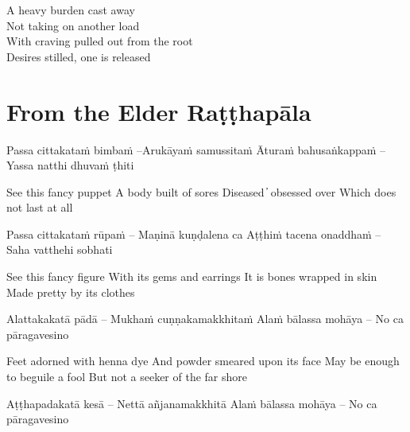 \begin{english}
  A heavy burden cast away\\
  Not taking on another load\\
  With craving pulled out from the root\\
  Desires stilled, one is released
\end{english}


\clearpage

\section{From the Elder Raṭṭhapāla}

\begin{leader}
\end{leader}

\begin{twochants}
Passa cittakataṁ bimbaṁ –Arukāyaṁ samussitaṁ
Āturaṁ bahusaṅkappaṁ – Yassa natthi dhuvaṁ ṭhiti
\end{twochants}

\begin{english}
See this fancy puppet
A body built of sores
Diseased  ̓  obsessed over
Which does not last at all
\end{english}

\begin{twochants}
Passa cittakataṁ rūpaṁ – Maṇinā kuṇḍalena ca
Aṭṭhiṁ tacena onaddhaṁ – Saha vatthehi sobhati
\end{twochants}

\begin{english}
See this fancy figure
With its gems and earrings
It is bones wrapped in skin
Made pretty by its clothes
\end{english}

\begin{twochants}
Alattakakatā pādā – Mukhaṁ cuṇṇakamakkhitaṁ
Alaṁ bālassa mohāya – No ca pāragavesino
\end{twochants}

\begin{english}
Feet adorned with henna dye
And powder smeared upon its face
May be enough to beguile a fool
But not a seeker of the far shore
\end{english}

\begin{twochants}
Aṭṭhapadakatā kesā – Nettā añjanamakkhitā
Alaṁ bālassa mohāya – No ca pāragavesino
\end{twochants}

